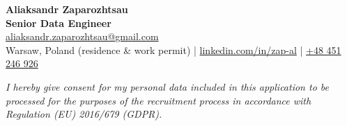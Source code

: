 \documentclass[10pt,a4paper]{article}
\newcommand{\linkedin}[1]{\href{https://www.linkedin.com/in/#1}{linkedin.com/in/#1}}
\newcommand{\email}[1]{\href{mailto:#1}{#1}}
\begin{document}
\begin{center}
  \huge\textbf{Aliaksandr Zaparozhtsau}\\
  \smallskip
  \large\textbf{Senior Data Engineer}\\
  \normalsize
  \email{aliaksandr.zaparozhtsau@gmail.com}\\
  Warsaw, Poland (residence \& work permit)
  | \linkedin{zap-al}
  | \href{tel:+48451246926}{+48 451 246 926}\\
\end{center}



\hfill



\hfill



\hfill



\vfill

\begin{center}
  \footnotesize\textit{I hereby give consent for my personal data included in this application to be processed for the purposes of the recruitment process in accordance with Regulation (EU) 2016/679 (GDPR).}
\end{center}
\end{document}
